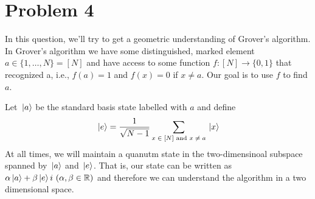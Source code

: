 \documentclass[10pt]{article}
\begin{document}
	\section*{Problem 4}
	In this question, we'll try to get a geometric understanding of Grover's algorithm. In Grover's algorithm 
	we have some distinguished, marked element \( a \in \{1, \dots, N\} = [N] \) and have access to some function 
	\( f: [N] \to \{0, 1\}  \) that recognized a, i.e., \( f(a) = 1 \) and \( f(x) = 0 \) if \( x \neq a \). 
	Our goal is to use \( f \) to find \( a \). 

	Let \( \ket*{a} \) be the standard basis state labelled with \( a\) and define
	\[
		\ket*{e} = \frac{1}{\sqrt{N - 1} }\sum_{\text{\( x \in [N] \) and \( x \neq a \)}} \ket*{x}
	\] 
	At all times, we will maintain a quanutm state in the two-dimensinoal subspace spanned by \( \ket*{a} \) and 
	\( \ket*{e} \). That is, our state can be written as 
	\( \alpha \ket*{a} + \beta\ket*{e} i\ (\alpha, \beta \in \R)\) and therefore we can understand the algorithm 
	in a two dimensional space.
\end{document}
